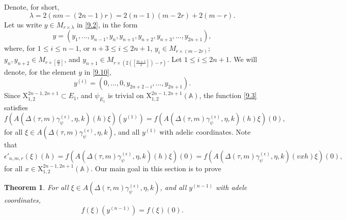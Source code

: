 \documentclass[12pts]{amsart}
\newcommand{\BA}{{\mathbb {A}}}
\newtheorem{thm}{Theorem}[section]
\begin{document}
Denote, for short,
$$
\lambda=2(nm-(2n-1)r)=2(n-1)(m-2r)+2(m-r).
$$
Let us write $y\in M_{r\times \lambda}$ in \eqref{9.2}, in the form
\begin{equation}\label{9.10}
y=(y_1,...,y_{n-1},y_n,y_{n+1},y_{n+2}, y_{n+3},...,y_{2n+1}),
\end{equation}
where, for $1\leq i\leq n-1$, or $n+3\leq i\leq 2n+1$, $y_i\in M_{r\times (m-2r)}$; $y_n, y_{n+2}\in M_{r\times [\frac{m}{2}]}$, and $y_{n+1}\in M_{r\times (2([\frac{m+1}{2}])-r)}$. Let $1\leq i \leq 2n+1$. We will denote, for the element $y$ in \eqref{9.10},
\begin{equation}\label{9.10.1}
y^{(i)}=(0,...,0, y_{2n+2-i},...,y_{2n+1}).
\end{equation} 
Since $\mathrm{X}_{1,2}^{2n-1,2n+1}\subset E_1$,
and $\psi_{E_1}$ is trivial on $\mathrm{X}_{1,2}^{2n-1,2n+1}(\BA)$, the function \eqref{9.3} satisfies
\begin{equation}\label{9.4}
f(A(\Delta(\tau,m)\gamma_\psi^{(\epsilon)},\eta, k)(h)\xi)(y^{(1)})=f(A(\Delta(\tau,m)\gamma_\psi^{(\epsilon)},\eta, k)(h)\xi)(0),
\end{equation}
for all $\xi\in A(\Delta(\tau,m)\gamma_\psi^{(\epsilon)},\eta, k)$, and all $y^{(1)}$ with adelic coordinates.
Note that
\begin{equation}\label{9.5}
\epsilon'_{n,m,r}(\xi)(h)=f(A(\Delta(\tau,m)\gamma_\psi^{(\epsilon)},\eta, k)(h)\xi)(0)=
f(A(\Delta(\tau,m)\gamma_\psi^{(\epsilon)},\eta, k)(vxh)\xi)(0),
\end{equation}
for all $x\in \mathrm{X}_{1,2}^{2n-1,2n+1}(\BA)$. 
Our main goal in this section is to prove
\begin{thm}\label{thm 9.1}
For all $\xi\in A(\Delta(\tau,m)\gamma_\psi^{(\epsilon)},\eta, k)$, and all $y^{(n-1)}$ with adele coordinates,
\begin{equation}\label{9.6}
f(\xi)(y^{(n-1)})=f(\xi)(0).
\end{equation}
\end{thm}
\end{document}
